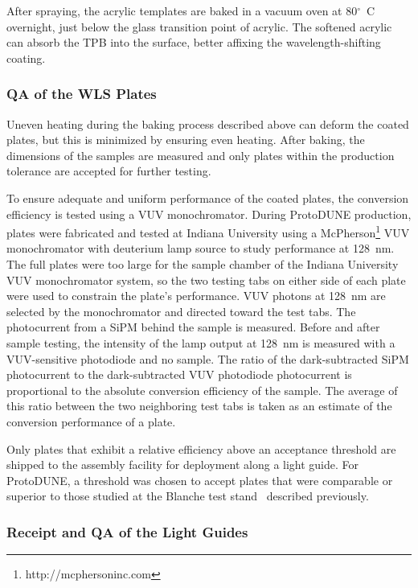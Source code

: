 After spraying, the acrylic templates are baked in a vacuum oven at 80$^{\circ}$~C overnight, just below the glass transition point of acrylic. The softened acrylic can absorb the TPB into the surface, better affixing the wavelength-shifting coating.


\subsubsection{QA of the WLS Plates}

Uneven heating during the baking process described above can deform the coated plates, but this is minimized by ensuring even heating. After baking, the dimensions of the samples are measured and only plates within the production tolerance are accepted for further testing.

To ensure adequate and uniform performance of the coated plates, the conversion efficiency is tested using a VUV monochromator. During ProtoDUNE production, plates were fabricated and tested at Indiana University using a McPherson\footnote{http://mcphersoninc.com} VUV monochromator with deuterium lamp source to study performance at 128~nm. The full plates were too large for the sample chamber of the Indiana University VUV monochromator system, so the two testing tabs on either side of each plate were used to constrain the plate's performance. VUV photons at 128~nm are selected by the monochromator and directed toward the test tabs. The photocurrent from a SiPM behind the sample is measured. Before and after sample testing, the intensity of the lamp output at 128~nm is measured with a VUV-sensitive photodiode and no sample. The ratio of the dark-subtracted SiPM photocurrent to the dark-subtracted VUV photodiode photocurrent is proportional to the absolute conversion efficiency of the sample. The average of this ratio between the two neighboring test tabs is taken as an estimate of the conversion performance of a plate.

Only plates that exhibit a relative efficiency above an acceptance threshold are shipped to the assembly facility for deployment along a light guide. For ProtoDUNE, a threshold was chosen to accept plates that were comparable or superior to those studied at the Blanche test stand~\cite{bib:DoubleShiftLG-NIM-171113} described previously.

\subsubsection{Receipt and QA of the Light Guides}

